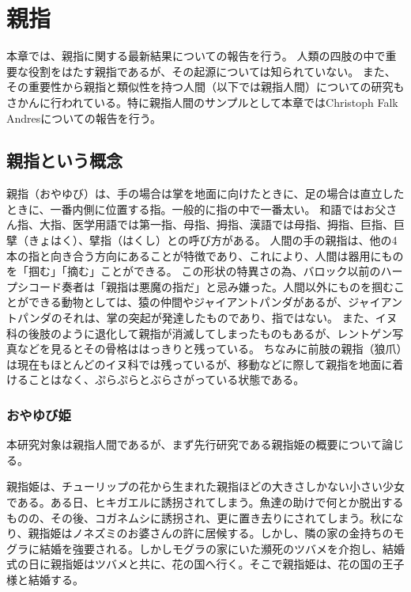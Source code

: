 \section{親指}
本章では、親指に関する最新結果についての報告を行う。
人類の四肢の中で重要な役割をはたす親指であるが、その起源については知られていない。
また、その重要性から親指と類似性を持つ人間（以下では親指人間）についての研究もさかんに行われている。特に親指人間のサンプルとして本章ではChristoph Falk Andresについての報告を行う。

\subsection{親指という概念}
親指（おやゆび）は、手の場合は掌を地面に向けたときに、足の場合は直立したときに、一番内側に位置する指。一般的に指の中で一番太い。
和語ではお父さん指、大指、医学用語では第一指、母指、拇指、漢語では母指、拇指、巨指、巨擘（きょはく）、擘指（はくし）との呼び方がある。
人間の手の親指は、他の4本の指と向き合う方向にあることが特徴であり、これにより、人間は器用にものを「掴む」「摘む」ことができる。
この形状の特異さの為、バロック以前のハープシコード奏者は「親指は悪魔の指だ」と忌み嫌った。人間以外にものを掴むことができる動物としては、猿の仲間やジャイアントパンダがあるが、ジャイアントパンダのそれは、掌の突起が発達したものであり、指ではない。
また、イヌ科の後肢のように退化して親指が消滅してしまったものもあるが、レントゲン写真などを見るとその骨格ははっきりと残っている。
ちなみに前肢の親指（狼爪）は現在もほとんどのイヌ科では残っているが、移動などに際して親指を地面に着けることはなく、ぷらぷらとぶらさがっている状態である。

\subsubsection{おやゆび姫}
本研究対象は親指人間であるが、まず先行研究である親指姫の概要について論じる。\par
親指姫は、チューリップの花から生まれた親指ほどの大きさしかない小さい少女である。ある日、ヒキガエルに誘拐されてしまう。魚達の助けで何とか脱出するものの、その後、コガネムシに誘拐され、更に置き去りにされてしまう。秋になり、親指姫はノネズミのお婆さんの許に居候する。しかし、隣の家の金持ちのモグラに結婚を強要される。しかしモグラの家にいた瀕死のツバメを介抱し、結婚式の日に親指姫はツバメと共に、花の国へ行く。そこで親指姫は、花の国の王子様と結婚する。\par

